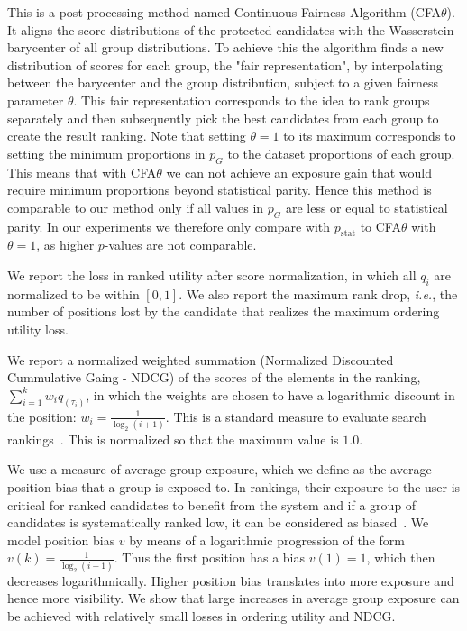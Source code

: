  This is a post-processing method named Continuous Fairness Algorithm (CFA$\theta$).
%
It aligns the score distributions of the protected candidates with the Wasserstein-barycenter of all group distributions.
%
To achieve this the algorithm finds a new distribution of scores for each group, the "fair representation", by interpolating between the barycenter and the group distribution, subject to a given fairness parameter $\theta$.
%
This fair representation corresponds to the idea to rank groups separately and then subsequently pick the best candidates from each group to create the result ranking.
%
Note that setting $\theta=1$ to its maximum corresponds to setting the minimum proportions in $p_G$ to the dataset proportions of each group.
%
This means that with CFA$\theta$ we can not achieve an exposure gain that would require minimum proportions beyond statistical parity.
%
Hence this method is comparable to our method only if all values in $p_G$ are less or equal to statistical parity.
%
In our experiments we therefore only compare \algoFAIR with $p_{\text{stat}}$ to CFA$\theta$ with $\theta=1$, as higher $p$-values are not comparable.


 We report the loss in ranked utility after score normalization, in which all $q_i$ are normalized to be within $[0, 1]$.
%
We also report the maximum rank drop, {\em i.e.}, the number of positions lost by the candidate that realizes the maximum ordering utility loss.


%
We report a normalized weighted summation (Normalized Discounted Cummulative Gaing - NDCG) of the scores of the elements in the ranking, $\sum_{i=1}^{k} w_i q_{(\tau_i)}$, in which the weights are chosen to have a logarithmic discount in the position:  $w_i = \frac{1}{\log_2 (i+1)}$. This is a standard measure to evaluate search rankings~\cite{jarvelin2002cumulated}.
This is normalized so that the maximum value is $1.0$.


 We use a measure of average group exposure, which we define as the average position bias that a group is exposed to.
%
In rankings, their exposure to the user is critical for ranked candidates to benefit from the system and if a group of candidates is systematically ranked low, it can be considered as biased~\cite{friedman1996bias}.
%
We model position bias $v$ by means of a logarithmic progression of the form $v(k) = \frac{1}{\log_2(i+1)}$.
%
Thus the first position has a bias $v(1)=1$, which then decreases logarithmically.
%
Higher position bias translates into more exposure and hence more visibility.
%
We show that large increases in average group exposure can be achieved with relatively small losses in ordering utility and NDCG.



